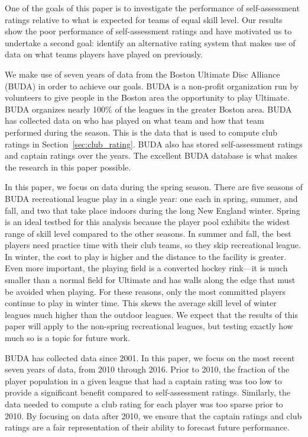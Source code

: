 One of the goals of this paper is to investigate the performance of self-assessment ratings relative to what is expected for teams of equal skill level.  Our results show the poor performance of self-assessment ratings and have motivated us to undertake a second goal: identify an alternative rating system that makes use of data on what teams players have played on previously. 

We make use of seven years of data from the Boston Ultimate Disc Alliance (BUDA) in order to achieve our goals. BUDA is a non-profit organization run by volunteers to give people in the Boston area the opportunity to play Ultimate. BUDA organizes nearly 100\% of the leagues in the greater Boston area. BUDA has collected data on who has played on what team and how that team performed during the season.  This is the data that is used to compute club ratings in Section~\ref{sec:club_rating}.  BUDA also has stored self-assessment ratings and captain ratings over the years.  The excellent BUDA database is what makes the research in this paper possible.  

In this paper, we focus on data during the spring season.  There are five seasons of BUDA recreational league play in a single year: one each in spring, summer, and fall, and two that take place indoors during the long New England winter. Spring is an ideal testbed for this analysis because the player pool exhibits the widest range of skill level compared to the other seasons.  In summer and fall, the best players need practice time with their club teams, so they skip recreational league.  In winter, the cost to play is higher and the distance to the facility is greater.  Even more important, the playing field is a converted hockey rink---it is much smaller than a normal field for Ultimate and has walls along the edge that must be avoided when playing.  For these reasons, only the most committed players continue to play in winter time. This skews the average skill level of winter leagues much higher than the outdoor leagues.  We expect that the results of this paper will apply to the non-spring recreational leagues, but testing exactly how much so is a topic for future work.

BUDA has collected data since 2001. In this paper, we focus on the most recent seven years of data, from 2010 through 2016.  Prior to 2010, the fraction of the player population in a given league that had a captain rating was too low to provide a significant benefit compared to self-assessment ratings.  Similarly, the data needed to compute a club rating for each player was too sparse prior to 2010. By focusing on data after 2010, we ensure that the captain ratings and club ratings are a fair representation of their ability to forecast future performance.

